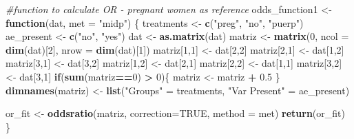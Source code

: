\documentclass[
]{article}
\newenvironment{Shaded}{\begin{snugshade}}{\end{snugshade}}
\newcommand{\CommentTok}[1]{\textcolor[rgb]{0.56,0.35,0.01}{\textit{#1}}}
\newcommand{\ControlFlowTok}[1]{\textcolor[rgb]{0.13,0.29,0.53}{\textbf{#1}}}
\newcommand{\DataTypeTok}[1]{\textcolor[rgb]{0.13,0.29,0.53}{#1}}
\newcommand{\DecValTok}[1]{\textcolor[rgb]{0.00,0.00,0.81}{#1}}
\newcommand{\FloatTok}[1]{\textcolor[rgb]{0.00,0.00,0.81}{#1}}
\newcommand{\KeywordTok}[1]{\textcolor[rgb]{0.13,0.29,0.53}{\textbf{#1}}}
\newcommand{\NormalTok}[1]{#1}
\newcommand{\OperatorTok}[1]{\textcolor[rgb]{0.81,0.36,0.00}{\textbf{#1}}}
\newcommand{\OtherTok}[1]{\textcolor[rgb]{0.56,0.35,0.01}{#1}}
\newcommand{\StringTok}[1]{\textcolor[rgb]{0.31,0.60,0.02}{#1}}
\begin{document}
\begin{Shaded}
\begin{Highlighting}[]
\CommentTok{#function to calculate OR - pregnant women as reference}
\NormalTok{odds_function1 <-}\StringTok{ }\ControlFlowTok{function}\NormalTok{(dat, }\DataTypeTok{met =} \StringTok{"midp"}\NormalTok{) \{}
\NormalTok{  treatments <-}\StringTok{ }\KeywordTok{c}\NormalTok{(}\StringTok{"preg"}\NormalTok{, }\StringTok{"no"}\NormalTok{, }\StringTok{"puerp"}\NormalTok{)}
\NormalTok{  ae_present <-}\StringTok{ }\KeywordTok{c}\NormalTok{(}\StringTok{"no"}\NormalTok{, }\StringTok{"yes"}\NormalTok{)}
\NormalTok{  dat <-}\StringTok{ }\KeywordTok{as.matrix}\NormalTok{(dat)}
\NormalTok{  matriz <-}\StringTok{ }\KeywordTok{matrix}\NormalTok{(}\DecValTok{0}\NormalTok{, }\DataTypeTok{ncol =} \KeywordTok{dim}\NormalTok{(dat)[}\DecValTok{2}\NormalTok{], }\DataTypeTok{nrow =} \KeywordTok{dim}\NormalTok{(dat)[}\DecValTok{1}\NormalTok{])}
\NormalTok{  matriz[}\DecValTok{1}\NormalTok{,}\DecValTok{1}\NormalTok{] <-}\StringTok{ }\NormalTok{dat[}\DecValTok{2}\NormalTok{,}\DecValTok{2}\NormalTok{]}
\NormalTok{  matriz[}\DecValTok{2}\NormalTok{,}\DecValTok{1}\NormalTok{] <-}\StringTok{ }\NormalTok{dat[}\DecValTok{1}\NormalTok{,}\DecValTok{2}\NormalTok{]}
\NormalTok{  matriz[}\DecValTok{3}\NormalTok{,}\DecValTok{1}\NormalTok{] <-}\StringTok{ }\NormalTok{dat[}\DecValTok{3}\NormalTok{,}\DecValTok{2}\NormalTok{]}
\NormalTok{  matriz[}\DecValTok{1}\NormalTok{,}\DecValTok{2}\NormalTok{] <-}\StringTok{ }\NormalTok{dat[}\DecValTok{2}\NormalTok{,}\DecValTok{1}\NormalTok{]}
\NormalTok{  matriz[}\DecValTok{2}\NormalTok{,}\DecValTok{2}\NormalTok{] <-}\StringTok{ }\NormalTok{dat[}\DecValTok{1}\NormalTok{,}\DecValTok{1}\NormalTok{]}
\NormalTok{  matriz[}\DecValTok{3}\NormalTok{,}\DecValTok{2}\NormalTok{] <-}\StringTok{ }\NormalTok{dat[}\DecValTok{3}\NormalTok{,}\DecValTok{1}\NormalTok{]}
  \ControlFlowTok{if}\NormalTok{(}\KeywordTok{sum}\NormalTok{(matriz}\OperatorTok{==}\DecValTok{0}\NormalTok{) }\OperatorTok{>}\StringTok{ }\DecValTok{0}\NormalTok{)\{}
\NormalTok{    matriz <-}\StringTok{ }\NormalTok{matriz }\OperatorTok{+}\StringTok{ }\FloatTok{0.5}
\NormalTok{  \}}
  \KeywordTok{dimnames}\NormalTok{(matriz) <-}\StringTok{ }\KeywordTok{list}\NormalTok{(}\StringTok{"Groups"}\NormalTok{ =}\StringTok{ }\NormalTok{treatments, }
                           \StringTok{"Var Present"}\NormalTok{ =}\StringTok{ }\NormalTok{ae_present)}
  
\NormalTok{  or_fit <-}\StringTok{ }\KeywordTok{oddsratio}\NormalTok{(matriz, }\DataTypeTok{correction=}\OtherTok{TRUE}\NormalTok{, }\DataTypeTok{method =}\NormalTok{ met)}
  \KeywordTok{return}\NormalTok{(or_fit)}
\NormalTok{\}}
\end{Highlighting}
\end{Shaded}
\end{document}
